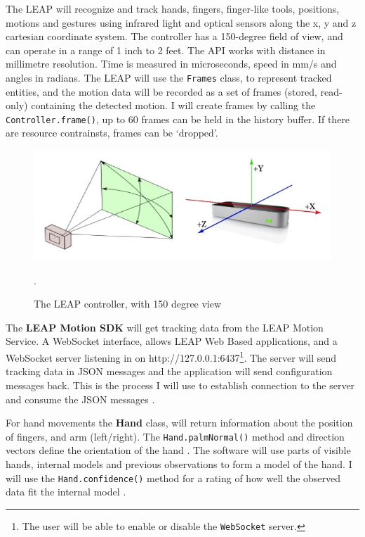 \documentclass[a4paper, 11pt]{article}
\begin{document}
\begin{justify}
The LEAP will recognize and track hands, fingers, finger-like tools, positions, motions and gestures using infrared light and optical sensors along the x, y and z cartesian coordinate system. The controller has a 150-degree field of view, and can operate in a range of 1 inch to 2 feet. The API works with distance in millimetre resolution. Time is measured in microseconds, speed in mm/s and angles in radians. The LEAP will use the \texttt{Frames} class, to represent tracked entities, and the motion data will be recorded as a set of frames (stored, read-only) containing the detected motion. I will create frames by calling the \texttt{Controller.frame()}, up to 60 frames can be held in the history buffer. If there are resource contrainsts, frames can be `dropped'.

\begin{figure}[H]
\begin{center}
\includegraphics[scale=0.4]{leap}\\
\caption{The LEAP controller, with 150 degree view \cite{leap}}.
\end{center}
\end{figure}

The \textbf{LEAP Motion SDK} will get tracking data from the LEAP Motion Service. A WebSocket interface, allows LEAP Web Based applications, and a WebSocket server listening in on http://127.0.0.1:6437\footnote{The user will be able to enable or disable the \texttt{WebSocket} server.}. The server will send tracking data in JSON messages and the application will send configuration messages back. This is the process I will use to establish connection to the server and consume the JSON messages \cite{leap}. 

For hand movements the \textbf{Hand} class, will return information about the position of fingers, and arm (left/right). The \texttt{Hand.palmNormal()} method and direction vectors define the orientation of the hand \cite{leap}. The software will use parts of visible hands, internal models and previous observations to form a model of the hand. I will use the \texttt{Hand.confidence()} method for a rating of how well the observed data fit the internal model \cite{leap}.


\end{justify}
\end{document}
